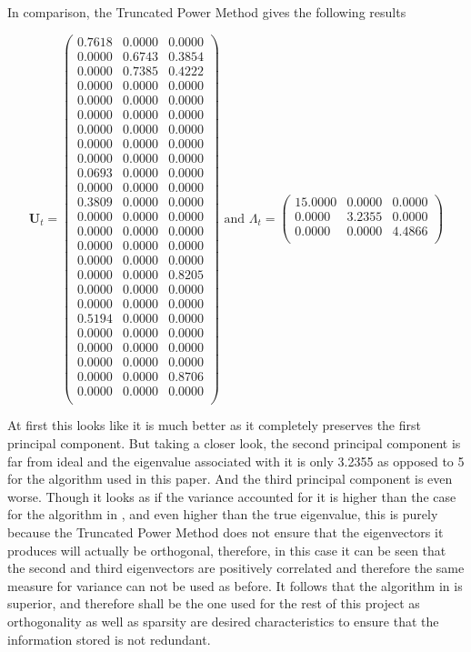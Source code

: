 \documentclass[11pt,a4paper]{article}
\begin{document}
In comparison, the Truncated Power Method \cite{truncpower} gives the following results

\begin{equation*}
\mathbf{U}_t= \begin{pmatrix}
0.7618&0.0000&0.0000\\
0.0000&0.6743&0.3854\\
0.0000&0.7385&0.4222\\
0.0000&0.0000&0.0000\\
0.0000&0.0000&0.0000\\
0.0000&0.0000&0.0000\\
0.0000&0.0000&0.0000\\
0.0000&0.0000&0.0000\\
0.0000&0.0000&0.0000\\
0.0693&0.0000&0.0000\\
0.0000&0.0000&0.0000\\
0.3809&0.0000&0.0000\\
0.0000&0.0000&0.0000\\
0.0000&0.0000&0.0000\\
0.0000&0.0000&0.0000\\
0.0000&0.0000&0.0000\\
0.0000&0.0000&0.8205\\
0.0000&0.0000&0.0000\\
0.0000&0.0000&0.0000\\
0.5194&0.0000&0.0000\\
0.0000&0.0000&0.0000\\
0.0000&0.0000&0.0000\\
0.0000&0.0000&0.0000\\
0.0000&0.0000&0.8706\\
0.0000&0.0000&0.0000\\
\end{pmatrix} \text{   and   }
\Lambda_t = \begin{pmatrix}
15.0000 & 0.0000&0.0000\\
0.0000 & 3.2355& 0.0000\\
0.0000&0.0000&4.4866\\
\end{pmatrix}
\end{equation*}

At first this looks like it is much better as it completely preserves the first principal component. But taking a closer look, the second principal component is far from ideal and the eigenvalue associated with it is only 3.2355 as opposed to 5 for the algorithm used in this paper. And the third principal component is even worse. Though it looks as if the variance accounted for it is higher than the case for the algorithm in \cite{dimakis}, and even higher than the true eigenvalue, this is purely because the Truncated Power Method does not ensure that the eigenvectors it produces will actually be orthogonal, therefore, in this case it can be seen that the second and third eigenvectors are positively correlated and therefore the same measure for variance can not be used as before. It follows that the algorithm in \cite{dimakis} is superior, and therefore shall be the one used for the rest of this project as orthogonality as well as sparsity are desired characteristics to ensure that the information stored is not redundant. 
\clearpage 
\end{document}
